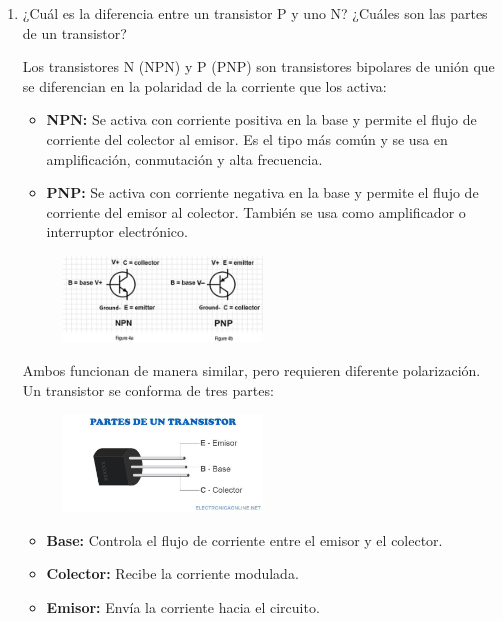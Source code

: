 \documentclass[12pt,letterpaper]{article}
\begin{document}
\begin{enumerate}
  \item ¿Cuál es la diferencia entre un transistor P y uno N? ¿Cuáles son las partes de un transistor?
    
    \bigskip
    Los transistores N (NPN) y P (PNP) son transistores bipolares de unión que se diferencian en la polaridad de la corriente que los activa:

    \begin{itemize}
    \item \textbf{NPN:} Se activa con corriente positiva en la base y permite el flujo de corriente del colector al emisor. Es el tipo más común y se usa en amplificación, conmutación y alta frecuencia.
    \item \textbf{PNP:} Se activa con corriente negativa en la base y permite el flujo de corriente del emisor al colector. También se usa como amplificador o interruptor electrónico.
    \end{itemize}

    \begin{figure}[H]
      \centering
      \includegraphics[width=0.5\textwidth]{transistores.png}
    \end{figure}
    
    Ambos funcionan de manera similar, pero requieren diferente polarización.
    Un transistor se conforma de tres partes:

    \begin{figure}[H]
      \centering
      \includegraphics[width=0.5\textwidth]{transistor.png}
    \end{figure}
    
    \begin{itemize}
    \item \textbf{Base:} Controla el flujo de corriente entre el emisor y el colector.
    \item \textbf{Colector:} Recibe la corriente modulada.
    \item \textbf{Emisor:} Envía la corriente hacia el circuito.
    \end{itemize}
      

\end{enumerate}
\end{document}
